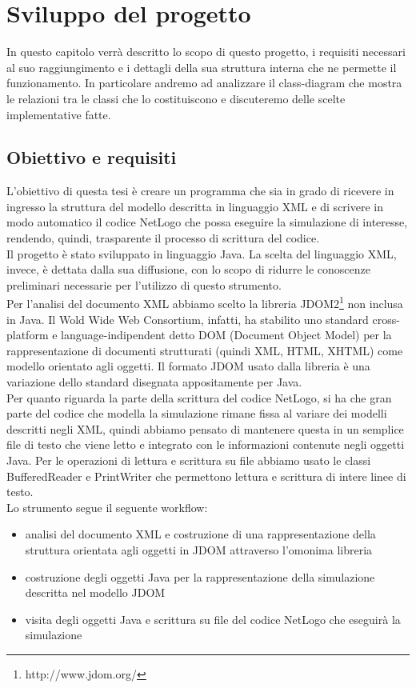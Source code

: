 \chapter{Sviluppo del progetto}
In questo capitolo verrà descritto lo scopo di questo progetto, i requisiti necessari al suo raggiungimento e i dettagli della sua struttura interna che ne permette il funzionamento. In particolare andremo ad analizzare il class-diagram che mostra le relazioni tra le classi che lo costituiscono e discuteremo delle scelte implementative fatte.

\section{Obiettivo e requisiti}
L'obiettivo di questa tesi è creare un programma che sia in grado di ricevere in ingresso la struttura del modello descritta in linguaggio XML e di scrivere in modo automatico il codice NetLogo che possa eseguire la simulazione di interesse, rendendo, quindi, trasparente il processo di scrittura del codice.\\
Il progetto è stato sviluppato in linguaggio Java. La scelta del linguaggio XML, invece, è dettata dalla sua diffusione, con lo scopo di ridurre le conoscenze preliminari necessarie per l'utilizzo di questo strumento.\\
Per l'analisi del documento XML abbiamo scelto la libreria JDOM2\footnote{http://www.jdom.org/} non inclusa in Java. Il Wold Wide Web Consortium, infatti, ha stabilito uno standard cross-platform e language-indipendent detto DOM (Document Object Model) per la rappresentazione di documenti strutturati (quindi XML, HTML, XHTML) come modello orientato agli oggetti. Il formato JDOM usato dalla libreria è una variazione dello standard disegnata appositamente per Java.\\
Per quanto riguarda la parte della scrittura del codice NetLogo, si ha che gran parte del codice che modella la simulazione rimane fissa al variare dei modelli descritti negli XML, quindi abbiamo pensato di mantenere questa in un semplice file di testo che viene letto e integrato con le informazioni contenute negli oggetti Java. Per le operazioni di lettura e scrittura su file abbiamo usato le classi BufferedReader e PrintWriter che permettono lettura e scrittura di intere linee di testo.\\
Lo strumento segue il seguente workflow:
\begin{itemize}
\item analisi del documento XML e costruzione di una rappresentazione della struttura orientata agli oggetti in JDOM attraverso l'omonima libreria
\item costruzione degli oggetti Java per la rappresentazione della simulazione descritta nel modello JDOM 
\item visita degli oggetti Java e scrittura su file del codice NetLogo che eseguirà la simulazione
\end{itemize}

